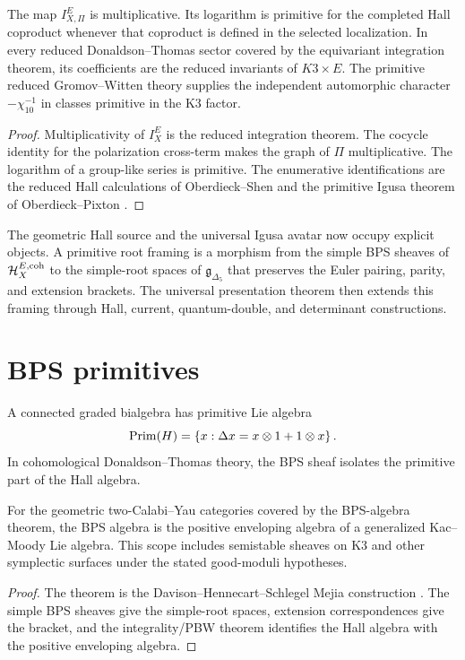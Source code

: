 \begin{theorem}
The map $I_{X,\Pi}^E$ is multiplicative.  Its logarithm is primitive for the completed Hall coproduct whenever that coproduct is defined in the selected localization.  In every reduced Donaldson--Thomas sector covered by the equivariant integration theorem, its coefficients are the reduced invariants of $K3\times E$.  The primitive reduced Gromov--Witten theory supplies the independent automorphic character $-\chi_{10}^{-1}$ in classes primitive in the K3 factor.
\end{theorem}
\begin{proof}
Multiplicativity of $I_X^E$ is the reduced integration theorem.  The cocycle identity for the polarization cross-term makes the graph of $\Pi$ multiplicative.  The logarithm of a group-like series is primitive.  The enumerative identifications are the reduced Hall calculations of Oberdieck--Shen and the primitive Igusa theorem of Oberdieck--Pixton \cite{OberdieckShen,OP}.
\end{proof}

The geometric Hall source and the universal Igusa avatar now occupy explicit objects.  A primitive root framing is a morphism from the simple BPS sheaves of $\mathcal H_X^{E,\mathrm{coh}}$ to the simple-root spaces of $\mathfrak g_{\Delta_5}$ that preserves the Euler pairing, parity, and extension brackets.  The universal presentation theorem then extends this framing through Hall, current, quantum-double, and determinant constructions.

\chapter{BPS primitives}
A connected graded bialgebra has primitive Lie algebra
\[
 \operatorname{Prim}(H)=\left\{x:\Delta x=x\otimes1+1\otimes x\right\}.
\]
In cohomological Donaldson--Thomas theory, the BPS sheaf isolates the primitive part of the Hall algebra.

\begin{theorem}
For the geometric two-Calabi--Yau categories covered by the BPS-algebra theorem, the BPS algebra is the positive enveloping algebra of a generalized Kac--Moody Lie algebra. This scope includes semistable sheaves on K3 and other symplectic surfaces under the stated good-moduli hypotheses.
\end{theorem}
\begin{proof}
The theorem is the Davison--Hennecart--Schlegel Mejia construction \cite{DHS}. The simple BPS sheaves give the simple-root spaces, extension correspondences give the bracket, and the integrality/PBW theorem identifies the Hall algebra with the positive enveloping algebra.
\end{proof}

